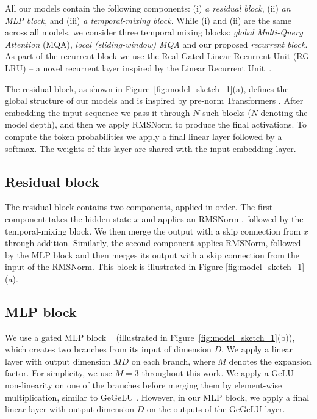 All our models contain the following components: (i) \emph{a residual block}, (ii) \emph{an MLP {block}}, and (iii) \emph{a temporal-mixing {block}}. While (i) and (ii) are the same across all models, we consider three temporal mixing {blocks}: \emph{global Multi-Query Attention} (MQA), \emph{local (sliding-window) MQA} and our proposed \emph{recurrent {block}}. As part of the recurrent {block} we use the Real-Gated Linear Recurrent Unit (RG-LRU) -- a novel recurrent layer  inspired by the Linear Recurrent Unit~\citep{orvieto2023resurrecting}.

The residual block, as shown in Figure~\ref{fig:model_sketch_1}(a), defines the global structure of our models and is inspired by pre-norm Transformers \citep{xiong2020layer}. After embedding the input sequence we pass it through $N$ such blocks ($N$ denoting the model depth), and then we apply RMSNorm \citep{zhang2019root} to produce the final activations. To compute the token probabilities we apply a final linear layer followed by a softmax. The weights of this layer are shared with the input embedding layer.

\subsection{Residual block}
\label{sec:residual_pattern}

The residual block contains two components, applied in order. The first component takes the hidden state $x$ and applies an RMSNorm \citep{zhang2019root}, followed by the temporal-mixing {block}. We then merge the output with a skip connection from $x$ through addition. Similarly, the second component applies RMSNorm, followed by the MLP {block} and then merges its output with a skip connection from the input of the RMSNorm. This block is illustrated in Figure \ref{fig:model_sketch_1} (a). 

\subsection{MLP {block}}

We use a gated MLP {block} ~\citep{dauphin2017language} (illustrated in Figure~\ref{fig:model_sketch_1}(b)), which creates two branches from its input of dimension $D$. We apply a linear layer with output dimension $MD$ on each branch, where $M$ denotes the expansion factor. For simplicity, we use $M=3$ throughout this work. We apply a GeLU non-linearity \citep{hendrycks2016gaussian} on one of the branches before merging them by element-wise multiplication, similar to GeGeLU \citep{shazeer2020glu}. However, in our MLP block, we apply a final linear layer with output dimension $D$ on the outputs of the GeGeLU layer. 

